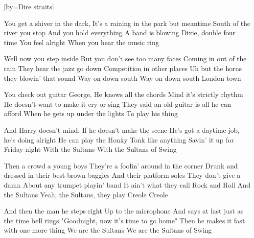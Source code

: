 [by={Dire straits}]

  \chordsoff

  \beginverse
  You get a shiver in the dark,
  It's a raining in the park but meantime
  South of the river you stop
  And you hold everything
  A band is blowing Dixie, double four time
  You feel alright
  When you hear the music ring
  \endverse

  \beginverse
  Well now you step inside
  But you don't see too many faces
  Coming in out of the rain
  They hear the jazz go down
  Competition in other places
  Uh but the horns they blowin' that sound
  Way on down south
  Way on down south
  London town
  \endverse


  \beginverse
  You check out guitar George,
  He knows all the chords
  Mind it's strictly rhythm
  He doesn't want to make it cry or sing
  They said an old guitar is all he can afford
  When he gets up under the lights
  To play his thing
  \endverse

  \beginverse
  And Harry doesn't mind,
  If he doesn't make the scene
  He's got a daytime job, he's doing alright
  He can play the Honky Tonk like anything
  Savin' it up for Friday night
  With the Sultans
  With the Sultans of Swing
  \endverse


  \beginverse
  Then a crowd a young boys
  They're a foolin' around in the corner
  Drunk and dressed in their best brown baggies
  And their platform soles
  They don't give a damn
  About any trumpet playin' band
  It ain't what they call Rock and Roll
  And the Sultans
  Yeah, the Sultans, they play Creole
  Creole
  \endverse


  \beginverse
  And then the man he steps right
  Up to the microphone
  And says at last just as the time bell rings
  "Goodnight, now it's time to go home"
  Then he makes it fast with one more thing
  We are the Sultans
  We are the Sultans of Swing
  \endverse

\endsong
